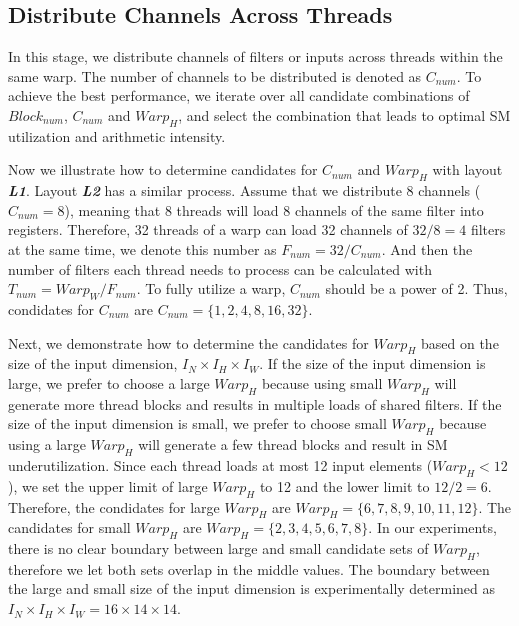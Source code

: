 \subsection{Distribute Channels Across Threads}
In this stage, we distribute channels of filters or inputs across threads within the same warp.
The number of channels to be distributed is denoted as $C_{num}$.
To achieve the best performance, we iterate over all candidate combinations of $Block_{num}$, $C_{num}$ and $Warp_H$, and select the combination that leads to optimal SM utilization and arithmetic intensity.

Now we illustrate how to determine candidates for $C_{num}$ and $Warp_H$ with layout \textbf{\emph{L1}}. 
Layout \textbf{\emph{L2}} has a similar process.
Assume that we distribute 8 channels ($C_{num}=8$), meaning that 8 threads will load 8 channels of the same filter into registers. 
Therefore, 32 threads of a warp can load 32 channels of $32/8=4$ filters at the same time, we denote this number as $F_{num}=32/C_{num}$.
And then the number of filters each thread needs to process can be calculated with $T_{num}=Warp_W/F_{num}$.
To fully utilize a warp, $C_{num}$ should be a power of 2.
Thus, condidates for $C_{num}$ are $C_{num}=\{1,2,4,8,16,32\}$.

Next, we demonstrate how to determine the candidates for $Warp_H$ based on the size of the input dimension, $I_N \times I_H \times I_W$.
If the size of the input dimension is large, we prefer to choose a large $Warp_H$ because using small $Warp_H$ will generate more thread blocks and results in multiple loads of shared filters.
If the size of the input dimension is small, we prefer to choose small $Warp_H$ because using a large $Warp_H$ will generate a few thread blocks and result in SM underutilization.
Since each thread loads at most 12 input elements ($Warp_H<12$), we set the upper limit of large $Warp_H$ to 12 and the lower limit to $12/2=6$. 
Therefore, the condidates for large $Warp_H$ are $Warp_H=\{6,7,8,9,10,11,12\}$.
The candidates for small $Warp_H$ are $Warp_H=\{2,3,4,5,6,7,8\}$.
In our experiments, there is no clear boundary between large and small candidate sets of $Warp_H$, therefore we let both sets overlap in the middle values.
The boundary between the large and small size of the input dimension is experimentally determined as $I_N \times I_H \times I_W=16 \times 14 \times 14$.

